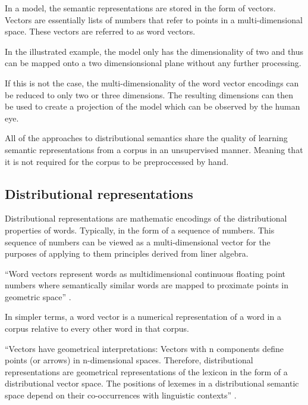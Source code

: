 \documentclass[14pt, a4paper]{extreport}
\begin{document}
In a model, the semantic representations are stored in the form of vectors. Vectors are essentially lists of numbers that refer to points in a multi-dimensional space. These vectors are referred to as word vectors.

In the illustrated example, the model only has the dimensionality of two and thus can be mapped onto a two dimensionsional plane without any further processing.

If this is not the case, the multi-dimensionality of the word vector encodings can be reduced to only two or three dimensions. The resulting dimensions can then be used to create a projection of the model which can be observed by the human eye.

All of the approaches to distributional semantics share the quality of learning semantic representations from a corpus in an unsupervised manner. Meaning that it is not required for the corpus to be preproccessed by hand.

\subsection{Distributional representations}
Distributional representations are mathematic encodings of the distributional properties of words. Typically, in the form of a sequence of numbers. This sequence of numbers can be viewed as a multi-dimensional vector for the purposes of applying to them principles derived from liner algebra.

``Word vectors represent words as multidimensional continuous floating point numbers where semantically similar words are mapped to proximate points in geometric space'' \parencite{ahireintro}.

In simpler terms, a word vector is a numerical representation of a word in a corpus relative to every other word in that corpus.


``Vectors have geometrical interpretations: Vectors with n components define points (or arrows) in n-dimensional spaces. Therefore, distributional representations are geometrical representations of the lexicon in the form of a distributional vector space. The positions of lexemes in a distributional semantic space depend on their co-occurrences with linguistic contexts'' \parencite{lenci}.
\end{document}
